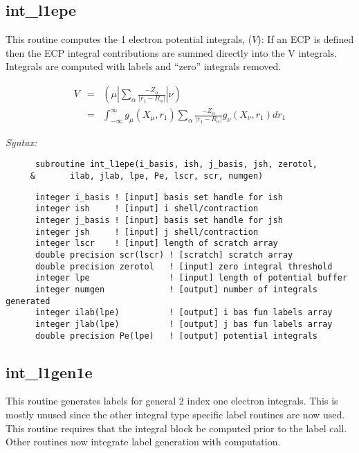 \subsection{int\_l1epe} 
This routine computes the 1 electron potential integrals, ($V$): 
If an ECP is defined then the ECP integral contributions are summed  
directly into the V integrals.  Integrals are computed with labels  
and ``zero'' integrals removed.   
 
\begin{eqnarray*} 
V & = & ({\mu}|\sum_{\alpha}\frac{-Z_{\alpha}}{|r_{1}-R_{\alpha}|}|{\nu}) \\ 
  & = & \int_{-\infty}^{\infty} g_{\mu}(X_{\mu},r_{1})\sum_{\alpha}\frac 
{-Z_{\alpha}}{|r_{1}-R_{\alpha}|}g_{\nu}(X_{\nu},r_{1})dr_{1}  
\end{eqnarray*} 
 
{\it Syntax:} 
\begin{verbatim} 
      subroutine int_l1epe(i_basis, ish, j_basis, jsh, zerotol, 
     &       ilab, jlab, lpe, Pe, lscr, scr, numgen)  
\end{verbatim} 
\begin{verbatim} 
      integer i_basis ! [input] basis set handle for ish 
      integer ish     ! [input] i shell/contraction 
      integer j_basis ! [input] basis set handle for jsh 
      integer jsh     ! [input] j shell/contraction 
      integer lscr    ! [input] length of scratch array 
      double precision scr(lscr) ! [scratch] scratch array 
      double precision zerotol   ! [input] zero integral threshold 
      integer lpe                ! [input] length of potential buffer 
      integer numgen             ! [output] number of integrals generated 
      integer ilab(lpe)          ! [output] i bas fun labels array 
      integer jlab(lpe)          ! [output] j bas fun labels array 
      double precision Pe(lpe)   ! [output] potential integrals 
\end{verbatim} 
\subsection{int\_l1gen1e} 
This routine generates labels for general 2 index one  
electron integrals.  This is mostly unused since the other  
integral type specific label routines are now used.  This  
routine requires that the integral block be computed prior  
to the label call.  Other routines now integrate label  
generation with computation.   
 
